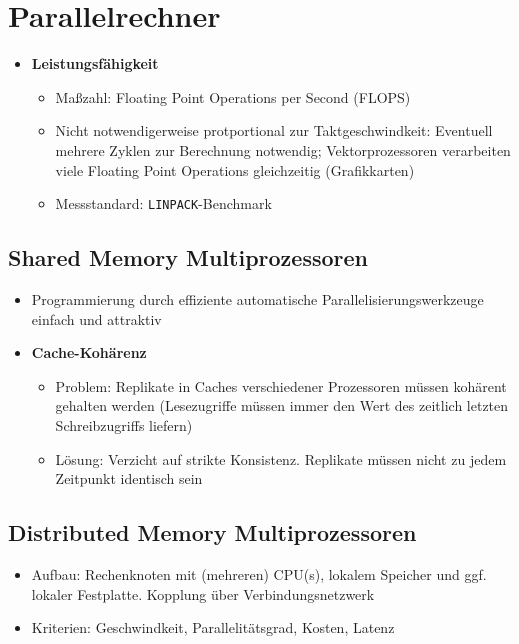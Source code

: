 \section{Parallelrechner}
\begin{itemize}
	\item \textbf{Leistungsfähigkeit}
	\begin{itemize}
		\item Maßzahl: Floating Point Operations per Second (FLOPS)
		\item Nicht notwendigerweise protportional zur Taktgeschwindkeit: Eventuell mehrere Zyklen zur Berechnung notwendig; Vektorprozessoren verarbeiten viele Floating Point Operations gleichzeitig (Grafikkarten)
		\item Messstandard: \texttt{LINPACK}-Benchmark
	\end{itemize}
\end{itemize}

\subsection{Shared Memory Multiprozessoren}
\begin{itemize}
	\item Programmierung durch effiziente automatische Parallelisierungswerkzeuge einfach und attraktiv
	\item \textbf{Cache-Kohärenz}
	\begin{itemize}
		\item Problem: Replikate in Caches verschiedener Prozessoren müssen kohärent gehalten werden (Lesezugriffe müssen immer den Wert des zeitlich letzten Schreibzugriffs liefern)
		\item Lösung: Verzicht auf strikte Konsistenz. Replikate müssen nicht zu jedem Zeitpunkt identisch sein
	\end{itemize}
\end{itemize}


\subsection{Distributed Memory Multiprozessoren}
\begin{itemize}
	\item Aufbau: Rechenknoten mit (mehreren) CPU(s), lokalem Speicher und ggf. lokaler Festplatte. Kopplung über Verbindungsnetzwerk
	\item Kriterien: Geschwindkeit, Parallelitätsgrad, Kosten, Latenz
\end{itemize}

